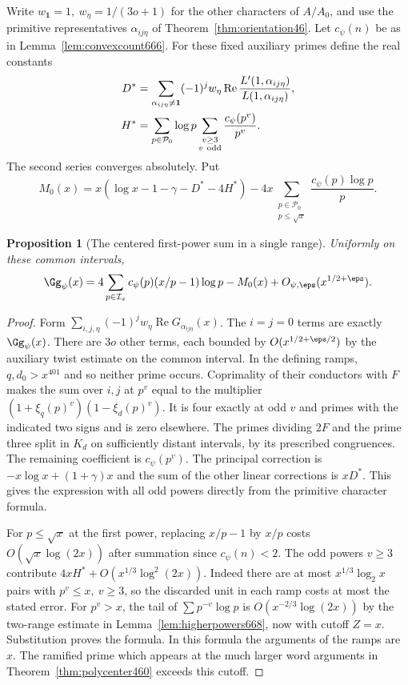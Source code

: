 \documentclass[a4paper,11pt]{article}
\newtheorem{proposition}{Proposition}[section]
\theoremstyle{definition}
\theoremstyle{remark}
\newcommand{\real}{\operatorname{Re}}\newcommand{\imag}{\operatorname{Im}}
\numberwithin{equation}{section}
\begin{document}
Write \(w_{\mathbf1}=1,\ w_\eta=1/(3o+1)\) for the other characters
of \(A/A_0\), and use the primitive representatives
\(\alpha_{ij\eta}\) of Theorem~\ref{thm:orientation46}. Let
\(c_\psi(n)\) be as in Lemma~\ref{lem:convexcount666}.
For these fixed auxiliary primes define the real constants
\[
 \begin{split}
 D^*&=\sum_{\alpha_{ij\eta}\ne\mathbf1}(-1)^j w_\eta
             \real\frac{L'(1,\alpha_{ij\eta})}{L(1,\alpha_{ij\eta})},\\
 H^*&=\sum_{p\in\mathcal P_0}\log p
           \sum_{\substack{v\ge3\\v\ {\rm odd}}}\frac{c_\psi(p^v)}{p^v}.
 \end{split}
\]
The second series converges absolutely. Put
\[
 M_0(x)=x(\log x-1-\gamma-D^*-4H^*)
        -4x\sum_{\substack{p\in\mathcal P_0\\p\le\sqrt{x}}}
               \frac{c_\psi(p)\log p}{p}.
\]

\begin{proposition}[The centered first-power sum in a single range]
\leavevmode\label{prop:primerange670}
Uniformly on these common intervals,
\[
 \Gg_\psi(x)=4\sum_{p\in\mathcal I_x}
          c_\psi(p)(x/p-1)\log p-M_0(x)
                 +O_{\psi,\eps}(x^{1/2+\eps}).
\]
\end{proposition}
\begin{proof}
Form \(\sum_{i,j,\eta}(-1)^jw_\eta\real G_{\alpha_{ij\eta}}(x)\).
The \(i=j=0\) terms are exactly \(\Gg_\psi(x)\).
There are \(3o\) other terms, each bounded by
\(O(x^{1/2+\eps/2})\) by the auxiliary twist estimate on the
common interval. In the defining ramps, \(q,d_0>x^{401}\)
and so neither prime occurs. Coprimality of their conductors
with \(F\) makes the sum over \(i,j\) at \(p^v\) equal to the
multiplier
\((1+\xi_q(p)^v)(1-\xi_d(p)^v)\). It is four exactly at odd
\(v\) and primes with the indicated two signs and is zero
elsewhere. The primes dividing \(2F\) and the prime three split
in \(K_d\) on sufficiently distant intervals, by its prescribed
congruences. The remaining coefficient is \(c_\psi(p^v)\).
The principal correction is \(-x\log x+(1+\gamma)x\) and the
sum of the other linear corrections is \(xD^*\). This gives
the expression with all odd powers directly from the primitive
character formula.

For \(p\le\sqrt x\) at the first power, replacing \(x/p-1\)
by \(x/p\) costs \(O(\sqrt x\log(2x))\) after summation since
\(c_\psi(n)<2\). The odd powers \(v\ge3\) contribute
\(4xH^*+O(x^{1/3}\log^2(2x))\). Indeed there are at most
\(x^{1/3}\log_2 x\) pairs with \(p^v\le x,\ v\ge3\), so the
discarded unit in each ramp costs at most the stated error.
For \(p^v>x\), the tail of
\(\sum p^{-v}\log p\) is \(O(x^{-2/3}\log(2x))\) by the
two-range estimate in Lemma~\ref{lem:higherpowers668}, now with
cutoff \(Z=x\). Substitution proves the formula. In this formula
the arguments of the ramps are \(x\). The ramified prime which
appears at the much larger word arguments in
Theorem~\ref{thm:polycenter460} exceeds this cutoff.
\end{proof}
\end{document}
